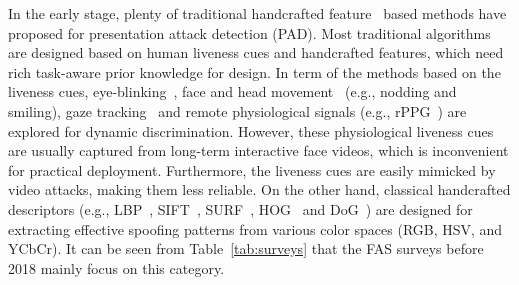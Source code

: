 \documentclass[10pt,journal,compsoc]{IEEEtran}
\begin{document}
In the early stage, plenty of traditional handcrafted feature~\cite{pan2007eye,li2016generalized,Pereira2012LBP,Komulainen2014Context,Patel2016Secure} based methods have proposed for presentation attack detection (PAD). Most traditional algorithms are designed based on human liveness cues and handcrafted features, which need rich task-aware prior knowledge for design. In term of the methods based on the liveness cues, eye-blinking~\cite{pan2007eye,jee2006liveness,li2008eye}, face and head movement~\cite{wang2009face,bao2009liveness} (e.g., nodding and smiling), gaze tracking~\cite{bigun2004assuring,ali2012liveness} and remote physiological signals (e.g., rPPG~\cite{li2016generalized,Liu2018Learning,lin2019face,yu2019remote1}) are explored for dynamic discrimination. However, these physiological liveness cues are usually captured from long-term interactive face videos, which is inconvenient for practical deployment. Furthermore, the liveness cues are easily mimicked by video attacks, making them less reliable. On the other hand, classical handcrafted descriptors (e.g., LBP~\cite{boulkenafet2015face,Pereira2012LBP}, 
SIFT~\cite{Patel2016Secure}, SURF~\cite{boulkenafet2016face2}, HOG~\cite{Komulainen2014Context} and DoG~\cite{tan2010face}) are designed for extracting effective spoofing patterns from various color spaces (RGB, HSV, and YCbCr). It can be seen from Table~\ref{tab:surveys} that the FAS surveys before 2018 mainly focus on this category. 

\end{document}
